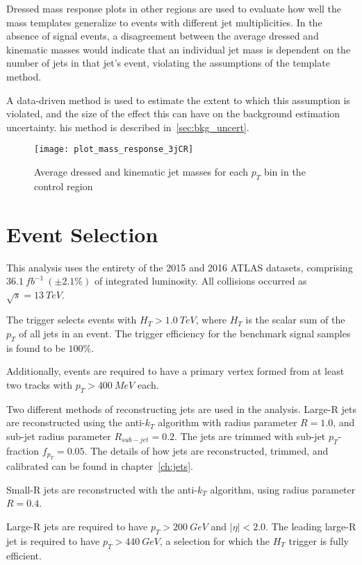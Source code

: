 Dressed mass response plots in other regions are used to evaluate how well the mass templates generalize to events with different jet multiplicities.
In the absence of signal events, a disagreement between the average dressed and kinematic masses would indicate that an individual jet mass is
dependent on the number of jets in that jet's event, violating the assumptions of the template method.

A data-driven method is used to estimate the extent to which this assumption is violated,
and the size of the effect this can have on the background estimation uncertainty.
his method is described in~\ref{sec:bkg_uncert}.

\begin{figure}[!ht]
    \texttt{[image: plot\_mass\_response\_3jCR]}
    \centering
    \caption{Average dressed and kinematic jet masses for each $p_T$ bin
    in the control region}
    \label{fig:response_3jCR}

\end{figure}

\section{Event Selection} \label{sec:event_selection}
This analysis uses the entirety of the 2015 and 2016 ATLAS datasets, comprising \linebreak
$36.1~fb^{-1}~(\pm2.1\%)$ of integrated luminosity.
All collisions occurred as $\sqrt{s}=13~TeV$.

The trigger selects events with $H_{T}>1.0~TeV$, where $H_{T}$ is the scalar sum of the $p_{T}$ of all jets in an event.
The trigger efficiency for the benchmark signal samples is found to be $100\%$.

Additionally, events are required to have a primary vertex formed from at least two tracks with $p_{T}>400~MeV$ each.

Two different methods of reconstructing jets are used in the analysis.
Large-R jets are reconstructed using the anti-$k_{T}$ algorithm with radius parameter $R=1.0$,
and sub-jet radius parameter $R_{sub-jet}=0.2$.
The jets are trimmed with sub-jet $p_{T}$-fraction $f_{p_{T}}=0.05$.
The details of how jets are reconstructed, trimmed, and calibrated can be found in chapter~\ref{ch:jets}.

Small-R jets are reconstructed with the anti-$k_{T}$ algorithm, using radius parameter $R=0.4$.

Large-R jets are required to have $p_{T}>200~GeV$ and $|\eta|<2.0$.
The leading large-R jet is required to have $p_{T}>440~GeV$, a selection for which the $H_{T}$ trigger is fully efficient.

